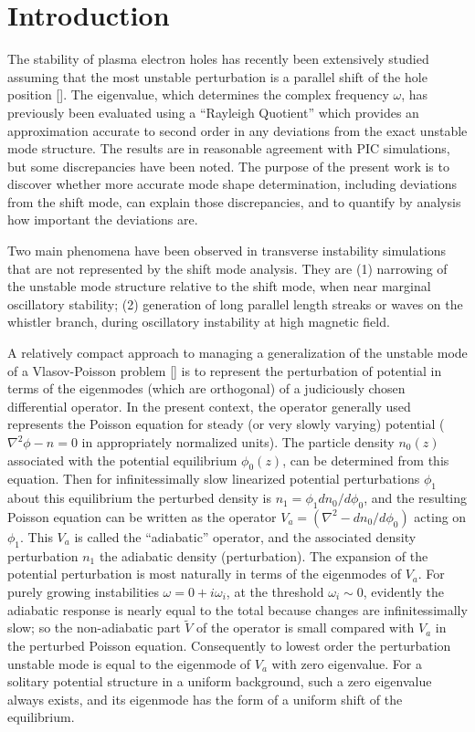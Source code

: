\documentclass[12pt]{article}
\begin{document}
\section{Introduction}

The stability of plasma electron holes has recently been extensively studied
assuming that the most unstable perturbation is a parallel shift of
the hole position []. The eigenvalue, which determines the complex
frequency $\omega$, has previously been evaluated using a ``Rayleigh
Quotient'' which provides an approximation accurate to second order in
any deviations from the exact unstable mode structure. The results are
in reasonable agreement with PIC simulations, but some discrepancies
have been noted. The purpose of the present work is to discover
whether more accurate mode shape determination, including deviations
from the shift mode, can explain those discrepancies, and to quantify
by analysis how important the deviations are.

Two main phenomena have been observed in transverse instability
simulations that are not represented by the shift mode analysis. They
are (1) narrowing of the unstable mode structure relative to the shift
mode, when near marginal oscillatory stability; (2) generation of long
parallel length streaks or waves on the whistler branch, during
oscillatory instability at high magnetic field.

A relatively compact approach to managing a generalization of the
unstable mode of a Vlasov-Poisson problem [] is to represent the
perturbation of potential in terms of the eigenmodes (which are
orthogonal) of a judiciously chosen differential operator. In the
present context, the operator generally used represents the Poisson
equation for steady (or very slowly varying) potential
($\nabla^2\phi-n=0$ in appropriately normalized units). The particle
density $n_0(z)$ associated with the potential equilibrium
$\phi_0(z)$, can be determined from this equation. Then for
infinitessimally slow linearized potential perturbations $\phi_1$
about this equilibrium the perturbed density is
$n_1=\phi_1dn_0/d\phi_0$, and the resulting Poisson equation can be
written as the operator $V_a =(\nabla^2-dn_0/d\phi_0)$ acting on
$\phi_1$. This $V_a$ is called the ``adiabatic'' operator, and the
associated density perturbation $n_1$ the adiabatic density
(perturbation). The expansion of the potential perturbation is most
naturally in terms of the eigenmodes of $V_a$. For purely growing
instabilities $\omega=0+i\omega_i$, at the threshold $\omega_i\sim 0$,
evidently the adiabatic response is nearly equal to the total because
changes are infinitessimally slow; so the non-adiabatic part
$\tilde V$ of the operator is small compared with $V_a$ in the
perturbed Poisson equation. Consequently to lowest order the
perturbation unstable mode is equal to the eigenmode of $V_a$ with
zero eigenvalue. For a solitary potential structure in a uniform
background, such a zero eigenvalue always exists, and its eigenmode
has the form of a uniform shift of the equilibrium.
\end{document}
